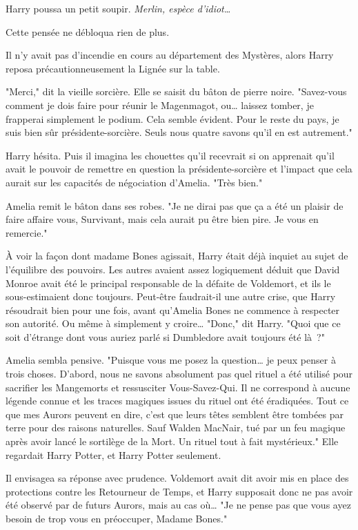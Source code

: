 Harry poussa un petit soupir. \emph{Merlin, espèce d'idiot…}

Cette pensée ne débloqua rien de plus.

Il n'y avait pas d'incendie en cours au département des Mystères, alors Harry reposa précautionneusement la Lignée sur la table.

"Merci," dit la vieille sorcière. Elle se saisit du bâton de pierre noire. "Savez-vous comment je dois faire pour réunir le Magenmagot, ou… laissez tomber, je frapperai simplement le podium. Cela semble évident. Pour le reste du pays, je suis bien sûr présidente-sorcière. Seuls nous quatre savons qu'il en est autrement."

Harry hésita. Puis il imagina les chouettes qu'il recevrait si on apprenait qu'il avait le pouvoir de remettre en question la présidente-sorcière et l'impact que cela aurait sur les capacités de négociation d'Amelia. "Très bien."

Amelia remit le bâton dans ses robes. "Je ne dirai pas que ça a été un plaisir de faire affaire vous, Survivant, mais cela aurait pu être bien pire. Je vous en remercie."

À voir la façon dont madame Bones agissait, Harry était déjà inquiet au sujet de l'équilibre des pouvoirs. Les autres avaient assez logiquement déduit que David Monroe avait été le principal responsable de la défaite de Voldemort, et ils le sous-estimaient donc toujours. Peut-être faudrait-il une autre crise, que Harry résoudrait bien pour une fois, avant qu'Amelia Bones ne commence à respecter son autorité. Ou même à simplement y croire… "Donc," dit Harry. "Quoi que ce soit d'étrange dont vous auriez parlé si Dumbledore avait toujours été là~?"

Amelia sembla pensive. "Puisque vous me posez la question… je peux penser à trois choses. D'abord, nous ne savons absolument pas quel rituel a été utilisé pour sacrifier les Mangemorts et ressusciter Vous-Savez-Qui. Il ne correspond à aucune légende connue et les traces magiques issues du rituel ont été éradiquées. Tout ce que mes Aurors peuvent en dire, c'est que leurs têtes semblent être tombées par terre pour des raisons naturelles. Sauf Walden MacNair, tué par un feu magique après avoir lancé le sortilège de la Mort. Un rituel tout à fait mystérieux." Elle regardait Harry Potter, et Harry Potter seulement.

Il envisagea sa réponse avec prudence. Voldemort avait dit avoir mis en place des protections contre les Retourneur de Temps, et Harry supposait donc ne pas avoir été observé par de futurs Aurors, mais au cas où… "Je ne pense pas que vous ayez besoin de trop vous en préoccuper, Madame Bones."


